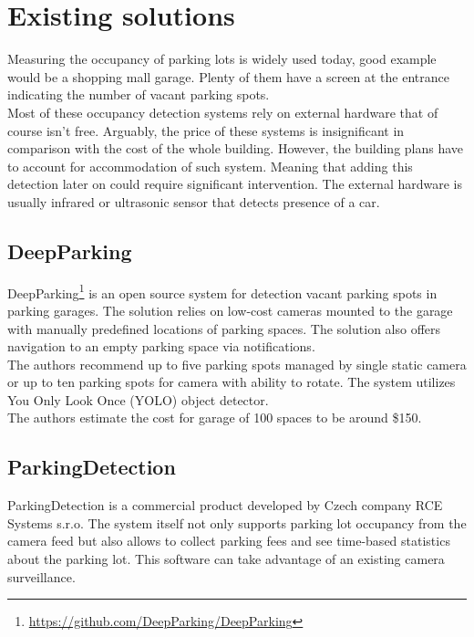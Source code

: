 \documentclass[thesis=M,english]{FITthesis}[2019/03/06]
\begin{document}
\section{Existing solutions}
Measuring the occupancy of parking lots is widely used today, good example would be a shopping mall garage. Plenty of them have a screen at the entrance indicating the number of vacant parking spots.\\

Most of these occupancy detection systems rely on external hardware that of course isn't free. Arguably, the price of these systems is insignificant in comparison with the cost of the whole building. However, the building plans have to account for accommodation of such system. Meaning that adding this detection later on could require significant intervention. The external hardware is usually infrared or ultrasonic sensor that detects presence of a car.\\


\subsection{DeepParking}
DeepParking\footnote{\url{https://github.com/DeepParking/DeepParking}} is an open source system for detection vacant parking spots in parking garages. The solution relies on low-cost cameras mounted to the garage with manually predefined locations of parking spaces. The solution also offers navigation to an empty parking space via notifications.\\

The authors recommend up to five parking spots managed by single static camera or up to ten parking spots for camera with ability to rotate. The system utilizes You Only Look Once (YOLO) object detector.\\


The authors estimate the cost for garage of 100 spaces to be around \$150.
\subsection{ParkingDetection}

ParkingDetection is a commercial product developed by Czech company RCE Systems s.r.o. The system itself not only supports parking lot occupancy from the camera feed but also allows to collect parking fees and see time-based statistics about the parking lot. This software can take advantage of an existing camera surveillance. \\
\end{document}
